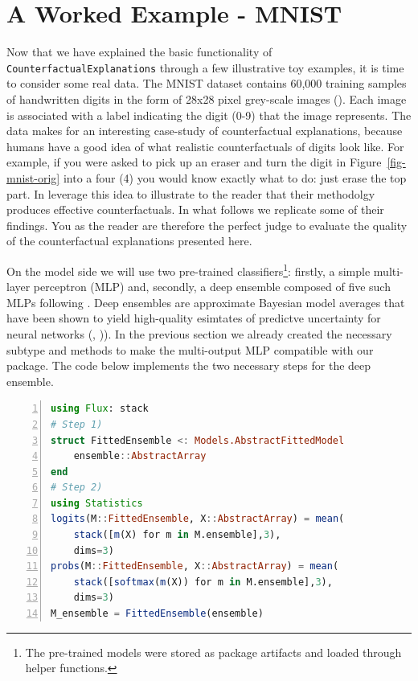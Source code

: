 \documentclass{juliacon}
\begin{document}
\hypertarget{sec-emp}{%
\section{A Worked Example - MNIST}\label{sec-emp}}

Now that we have explained the basic functionality of
\texttt{CounterfactualExplanations} through a few illustrative toy
examples, it is time to consider some real data. The MNIST dataset
contains 60,000 training samples of handwritten digits in the form of
28x28 pixel grey-scale images (\cite{lecun1998mnist}). Each image is
associated with a label indicating the digit (0-9) that the image
represents. The data makes for an interesting case-study of
counterfactual explanations, because humans have a good idea of what
realistic counterfactuals of digits look like. For example, if you were
asked to pick up an eraser and turn the digit in
Figure~\ref{fig-mnist-orig} into a four (4) you would know exactly what
to do: just erase the top part. In \cite{schut2021generating} leverage
this idea to illustrate to the reader that their methodolgy produces
effective counterfactuals. In what follows we replicate some of their
findings. You as the reader are therefore the perfect judge to evaluate
the quality of the counterfactual explanations presented here.

On the model side we will use two pre-trained classifiers\footnote{The
  pre-trained models were stored as package artifacts and loaded through
  helper functions.}: firstly, a simple multi-layer perceptron (MLP)
and, secondly, a deep ensemble composed of five such MLPs following
\cite{schut2021generating}. Deep ensembles are approximate Bayesian
model averages that have been shown to yield high-quality esimtates of
predictve uncertainty for neural networks (\cite{wilson2019case.pdf},
\cite{lakshminarayanan2016simple})). In the previous section we already
created the necessary subtype and methods to make the multi-output MLP
compatible with our package. The code below implements the two necessary
steps for the deep ensemble.

\begin{lstlisting}[language=Julia, escapechar=@, numbers=left]
using Flux: stack
# Step 1)
struct FittedEnsemble <: Models.AbstractFittedModel
    ensemble::AbstractArray
end
# Step 2)
using Statistics
logits(M::FittedEnsemble, X::AbstractArray) = mean(
    stack([m(X) for m in M.ensemble],3), 
    dims=3)
probs(M::FittedEnsemble, X::AbstractArray) = mean(
    stack([softmax(m(X)) for m in M.ensemble],3),
    dims=3)
M_ensemble = FittedEnsemble(ensemble)
\end{lstlisting}
\end{document}
